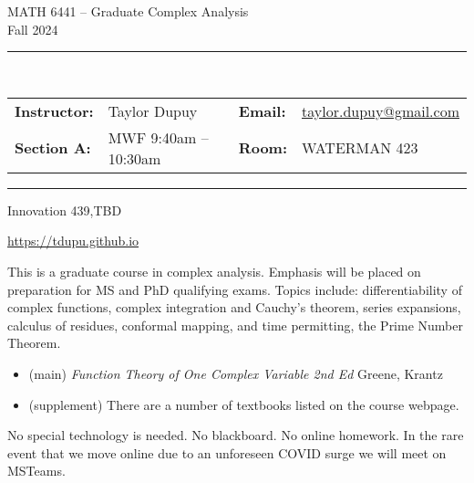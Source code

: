 \documentclass[11pt, letterpaper]{article}
\theoremstyle{definition}
\theoremstyle{remark}
\begin{document}
\begin{center}
{\Large {\sc MATH 6441 -- Graduate Complex Analysis}}
\\[1em]
{\large Fall 2024}
\end{center}

\begin{center}
	\rule{6in}{0.4pt}
	\\[2pt]
	\begin{tabular}{llcll}
		{\bf Instructor:} &Taylor Dupuy &\quad &	{\bf Email:}&\href{mailto:taylor.dupuy@gmail.com}{taylor.dupuy@gmail.com} \\
		{\bf Section A:} &MWF 9:40am -- 10:30am & \quad &{\bf Room:}& WATERMAN 423 \\
	\end{tabular}
	\rule{6in}{0.4pt}
\end{center}

\vspace{2em}

 Innovation 439,TBD
\vspace{1em}

 \url{https://tdupu.github.io}
\vspace{1em}

This is a graduate course in complex analysis. 
Emphasis will be placed on preparation for MS and PhD qualifying exams. 
Topics include: differentiability of complex functions, complex integration and Cauchy's theorem, series expansions, calculus of residues, conformal mapping, and time permitting, the Prime Number Theorem.
\par 

\vspace{1em}

\begin{itemize}
\item (main) \emph{Function Theory of One Complex Variable 2nd Ed} Greene, Krantz

\item (supplement) There are a number of textbooks listed on the course webpage. 
\end{itemize}
\vspace{1em}

 No special technology is needed. 
No blackboard. 
No online homework. 
In the rare event that we move online due to an unforeseen COVID surge we will meet on MSTeams.
\vspace{1em}
\end{document}
